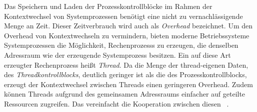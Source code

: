 Das Speichern und Laden der Prozesskontrollblöcke im Rahmen der Kontextwechsel von Systemprozessen benötigt eine nicht zu vernachlässigende Menge an Zeit. Dieser Zeitverbrauch wird auch als \emph{Overhead} bezeichnet. Um den Overhead von Kontextwechseln zu vermindern, bieten moderne Betriebssysteme Systemprozessen die Möglichkeit, \glspl{Rechenprozess} zu erzeugen, die denselben Adressraum wie der erzeugende Systemprozess besitzen. Ein auf diese Art erzeugter \gls{Rechenprozess} heißt \emph{Thread}. Da die Menge der thread-eigenen Daten, des \emph{Threadkontrollblocks}, deutlich geringer ist als die des Prozesskontrollblocks, erzeugt der Kontextwechsel zwischen Threads einen geringeren Overhead. Zudem können Threads aufgrund des gemeinsamen Adressraums einfacher auf geteilte Ressourcen zugreifen. Das vereinfacht die Kooperation zwischen diesen ~\cite[S.~139~\psqq]{Tanenbaum2016}.

